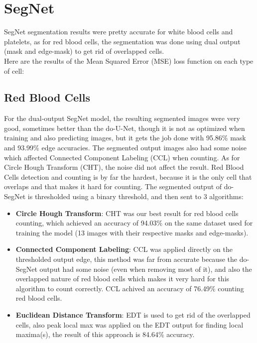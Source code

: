 

\section{SegNet}
SegNet segmentation results were pretty accurate for white blood cells and platelets, as for red blood cells, the segmentation was done using dual output (mask and edge-mask) to get rid of overlapped cells.\\
Here are the results of the Mean Squared Error (MSE) loss function on each type of cell:



\subsection{Red Blood Cells}
For the dual-output SegNet model, the resulting segmented images were very good, sometimes better than the do-U-Net, though it is not as optimized when training and also predicting images, but it gets the job done with 95.86\% mask and 93.99\% edge accuracies. The segmented output images also had some noise which affected Connected Component Labeling (CCL) when counting.
As for Circle Hough Transform (CHT), the noise did not affect the result.
Red Blood Cells detection and counting is by far the hardest, because it is the only cell that overlaps and that makes it hard for counting.
The segmented output of do-SegNet is thresholded using a binary threshold, and then sent to 3 algorithms:

\begin{itemize}
  \item \textbf{Circle Hough Transform}: CHT was our best result for red blood cells counting, which achieved an accuracy of 94.03\% on the same dataset used for training the model (13 images with their respective masks and edge-masks).
  \item \textbf{Connected Component Labeling}: CCL was applied directly on the thresholded output edge, this method was far from accurate because the do-SegNet output had some noise (even when removing most of it), and also the overlapped nature of red blood cells which makes it very hard for this algorithm to count correctly. CCL achived an accuracy of 76.49\% counting red blood cells.
  \item \textbf{Euclidean Distance Transform}: EDT is used to get rid of the overlapped cells, also peak local max was applied on the EDT output for finding local maxima(s), the result of this approach is 84.64\% accuracy.
\end{itemize}

